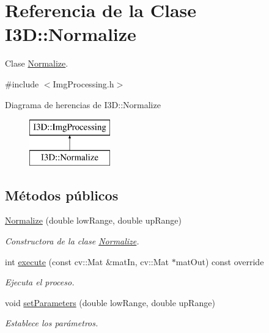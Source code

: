 \hypertarget{class_i3_d_1_1_normalize}{}\section{Referencia de la Clase I3D\+:\+:Normalize}
\label{class_i3_d_1_1_normalize}


Clase \hyperlink{class_i3_d_1_1_normalize}{Normalize}.  




{\ttfamily \#include $<$Img\+Processing.\+h$>$}

Diagrama de herencias de I3D\+:\+:Normalize\begin{figure}[H]
\begin{center}
\leavevmode
\includegraphics[height=2.000000cm]{class_i3_d_1_1_normalize}
\end{center}
\end{figure}
\subsection*{Métodos públicos}
\begin{DoxyCompactItemize}
\item 
\hyperlink{class_i3_d_1_1_normalize_abeae8c0f45fc949785ebf3e23f0de549}{Normalize} (double low\+Range, double up\+Range)
\begin{DoxyCompactList}\small\item\em Constructora de la clase \hyperlink{class_i3_d_1_1_normalize}{Normalize}. \end{DoxyCompactList}\item 
int \hyperlink{class_i3_d_1_1_normalize_a14506e377bd5da73c37ce960c2fdf07e}{execute} (const cv\+::\+Mat \&mat\+In, cv\+::\+Mat $\ast$mat\+Out) const  override
\begin{DoxyCompactList}\small\item\em Ejecuta el proceso. \end{DoxyCompactList}\item 
void \hyperlink{class_i3_d_1_1_normalize_a58456ec9333d041e0a86c9f03dec92da}{set\+Parameters} (double low\+Range, double up\+Range)
\begin{DoxyCompactList}\small\item\em Establece los parámetros. \end{DoxyCompactList}\end{DoxyCompactItemize}
